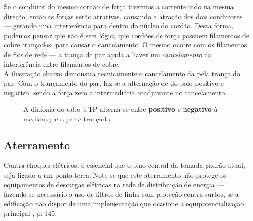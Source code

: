 \documentclass[	DIV=calc,%
							paper=a4,%
							fontsize=12pt,%
							onecolumn]{scrartcl}	 					%
\begin{document}
Se o condutor do mesmo cordão de força tivermos a corrente indo na mesma direção, então as forças serão atrativas, causando a atração dos dois condutores --- gerando uma interferência para dentro do núcleo do cordão. Desta forma, podemos pensar que não é sem lógica que cordões de força possuem filamentos de cobre trançados: para causar o cancelamento. O mesmo ocorre com os filamentos de fios de rede --- a trança do par ajuda a haver um \textit{cancelamento} da interferência entre filamentos de cobre.
\\

A ilustração abaixo demonstra tecnicamente o cancelamento da pela trança do par. Com o trançamento do par, faz-se a alternação de do polo positivo e negativo, sendo a força zero a intermediária coadjuvante no cancelamento.
\\

\begin{figure}[H]
	\noindent{}
	\caption{A diafonia do cabo UTP alterna-se entre \textbf{positivo} e \textbf{negativo} à medida que o par é trançado. \cite{cancel}}
	\label{fig6}
\end{figure}



\subsection{Aterramento}

Contra choques elétricos, é essencial que o pino central da tomada padrão atual, seja ligado a um ponto terra. Note-se que este aterramento não protege os equipamentos de descargas elétricas na rede de distribuição de energia --- fazendo-se necessário o uso de filtros de linha com proteção contra surtos, se a edificação não dispor de uma implementação que ocasione a equipotencialização principal \cite{abnt5410}, p. 145.
\end{document}
